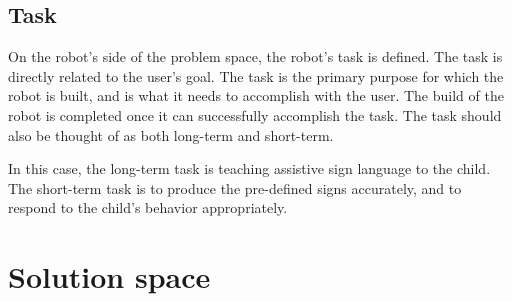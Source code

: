 \subsection{Task}

On the robot's side of the problem space, the robot's task is defined. The task is directly related to the user's goal. The task is the primary purpose for which the robot is built, and is what it needs to accomplish with the user. The build of the robot is completed once it can successfully accomplish the task. The task should also be thought of as both long-term and short-term.

In this case, the long-term task is teaching assistive sign language to the child. The short-term task is to produce the pre-defined signs accurately, and to respond to the child's behavior appropriately.




\section{Solution space}

\label{chapter:solution}

